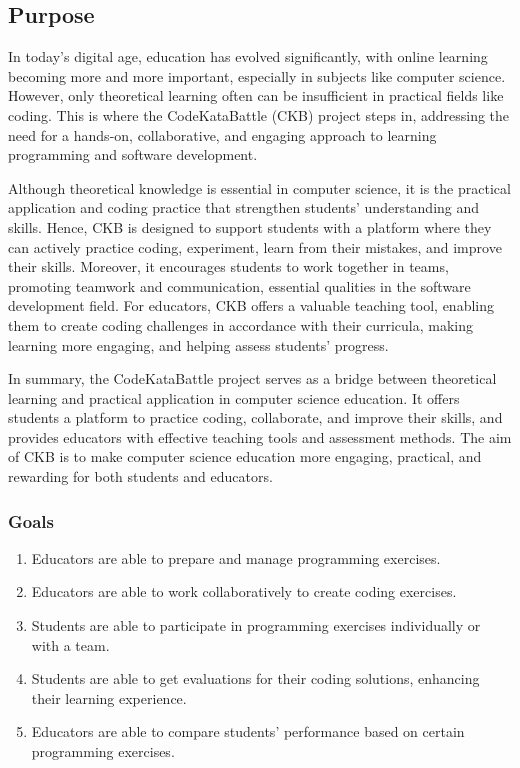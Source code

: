 
\subsection{Purpose}
In today's digital age, education has evolved significantly, with online learning becoming more and more important, especially in subjects like computer science. However, only theoretical learning often can be insufficient in practical fields like coding. This is where the CodeKataBattle (CKB) project steps in, addressing the need for a hands-on, collaborative, and engaging approach to learning programming and software development.


Although theoretical knowledge is essential in computer science, it is the practical application and coding practice that strengthen students' understanding and skills. Hence, CKB is designed to support students with a platform where they can actively practice coding, experiment, learn from their mistakes, and improve their skills. Moreover, it encourages students to work together in teams, promoting teamwork and communication, essential qualities in the software development field. For educators, CKB offers a valuable teaching tool, enabling them to create coding challenges in accordance with their curricula, making learning more engaging, and helping assess students' progress.


In summary, the CodeKataBattle project serves as a bridge between theoretical learning and practical application in computer science education. It offers students a platform to practice coding, collaborate, and improve their skills, and provides educators with effective teaching tools and assessment methods. The aim of CKB is to make computer science education more engaging, practical, and rewarding for both students and educators.

\subsubsection{Goals}

\begin{enumerate}

 \item Educators are able to prepare and manage programming exercises.
 \item Educators are able to work collaboratively to create coding exercises.
 \item Students are able to participate in programming exercises individually or with a team.
 \item Students are able to get evaluations for their coding solutions, enhancing their learning experience.
 \item Educators are able to compare students' performance based on certain programming exercises.

 
 





\end{enumerate}

